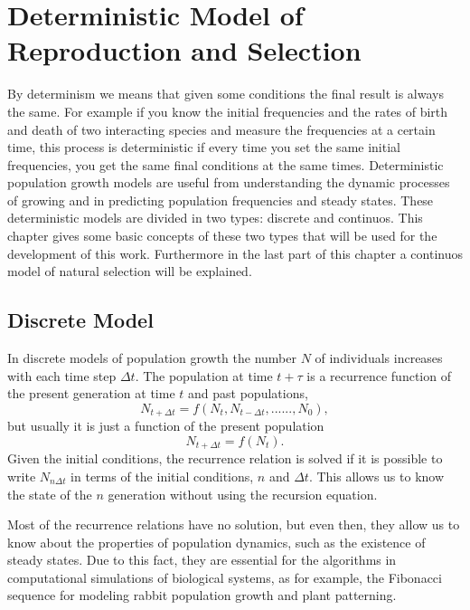 \chapter{Deterministic Model of Reproduction and Selection}
\ifpdf
    \graphicspath{{DeterministicModelofReproductionandSelection/Chapter2Figs/PNG/}{DeterministicModelofReproductionandSelection/Chapter2Figs/PDF/}{DeterministicModelofReproductionandSelection/Chapter2Figs/}}
\else
    \graphicspath{{DeterministicModelofReproductionandSelection/Chapter2Figs/EPS/}{DeterministicModelofReproductionandSelection/Chapter2Figs/}}
\fi
By determinism we means that given some conditions the final result is always  the same. For example if you know the initial frequencies and the rates of birth and death of two interacting species and measure  the frequencies at a certain time, this process is deterministic if every time  you set the same initial frequencies, you get the same final conditions at the same times. Deterministic population growth models are useful from understanding  the dynamic processes of growing and in predicting population frequencies and steady states. These deterministic models are divided in two types: discrete and continuos. This chapter gives some basic concepts of these two types that will be used for the development of this work. Furthermore in the last part of this chapter a continuos model of natural selection will be explained. 
\section{Discrete Model}
In discrete models of population growth the number $N$ of individuals increases with each time step $\Delta t$. The population at time $t+\tau$ is a recurrence function of the present generation at time $t$ and past populations, 
\begin{equation}
N_{t+\Delta t}=f(N_{t},N_{t-\Delta t}, ......, N_{0}),
\end{equation}
but usually it is just a function of the present population
\begin{equation}
N_{t+\Delta t}=f(N_{t}).
\end{equation} 
Given the initial conditions, the recurrence relation is solved if  it is possible to write $N_{n\Delta t }$ in terms of the initial conditions, $n$ and $\Delta t$. This allows us to know the state of the $n$ generation without using the recursion equation. 

Most of the recurrence relations have no solution, but even then, they  allow us to know about the properties of population dynamics, such as the existence of steady states. Due to this fact, they are essential for the algorithms in computational simulations of biological systems, as for example, the Fibonacci sequence for modeling rabbit population growth and plant patterning.

